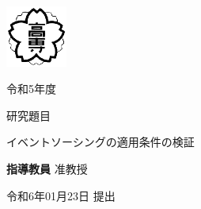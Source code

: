 \documentclass[../../main]{subfiles}
\begin{document}
    \begin{titlepage}
        \begin{center}
            \thispagestyle{empty}
            \includegraphics[width=2cm]{./picture/titlepage.png}
            \LARGE
            \keisen
            {
                 \fontsize{12mm}{12mm} \selectfont
            }
            \begin{flushright}
            {
                \huge
                令和5年度
            }
            \end{flushright}
            \vspace{-4mm}
            \keisen
            \vspace{1mm}
            \begin{flushleft}
                研究題目
            \end{flushleft}
            \vspace{1mm}
            {
                \huge
                イベントソーシングの適用条件の検証
            }
            \vspace{-2mm}
            \keisen
            \vspace{40mm}

            \begin{flushleft}
                \textbf{指導教員}
                \hspace{4zw}
                \hspace{2zw}准教授
            \end{flushleft}

            \vspace{-6mm}
            \keisen

            \begin{flushleft}
                \textbf{}
                \hspace{4zw}
            \end{flushleft}

            \vspace{-6mm}
            \keisen

            令和6年01月23日 提出

            \textbf{}

\end{center}
\end{titlepage}
\end{document}
